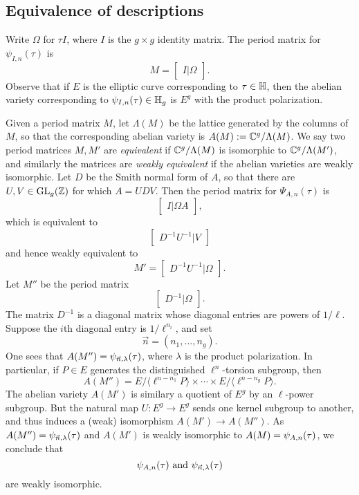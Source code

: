 \documentclass{amsart}
\begin{document}
\subsection{Equivalence of descriptions}

Write $\Omega$ for $\tau I$, where $I$ is the $g \times g$ identity matrix. The period matrix for $\psi_{I,n}(\tau)$ is
\[
  M = \begin{bmatrix}
    I | \Omega
  \end{bmatrix}.
\]
Observe that if $E$ is the elliptic curve corresponding to $\tau \in \mathbb{H}$, then the abelian variety corresponding to $\psi_{I,n}(\tau) \in \mathbb{H}_g$ is $E^g$ with the product polarization.

Given a period matrix $M$, let $\Lambda(M)$ be the lattice generated by the columns of $M$, so that the corresponding abelian variety is $A(M) := \mathbb{C}^g/\Lambda(M)$. We say two period matrices $M, M'$ are \emph{equivalent} if $\mathbb{C}^g/\Lambda(M)$ is isomorphic to $\mathbb{C}^g/\Lambda(M')$, and similarly the matrices are \emph{weakly equivalent} if the abelian varieties are weakly isomorphic. Let $D$ be the Smith normal form of $A$, so that there are $U,V \in \operatorname{GL}_g(\mathbb{Z})$ for which $A = UDV$. Then the period matrix for $\Psi_{A,n}(\tau)$ is
\[
  \begin{bmatrix}
    I | \Omega A
  \end{bmatrix},
\]
which is equivalent to
\[
  \begin{bmatrix}
    D^{-1}U^{-1} | V
  \end{bmatrix}
\]
and hence weakly equivalent to
\[
M' = \begin{bmatrix}
    D^{-1}U^{-1} | \Omega
  \end{bmatrix}.
\]
Let $M''$ be the period matrix\[
  \begin{bmatrix}
    D^{-1} | \Omega
  \end{bmatrix}.
\]
The matrix $D^{-1}$ is a diagonal matrix whose diagonal entries are powers of $1/\ell$. Suppose the $i$th diagonal entry is $1/\ell^{n_i}$, and set
\[
  \vec{n} = (n_1, \ldots, n_g).
\]
One sees that $A(M'') = \psi_{\vec{n},\lambda}(\tau)$, where $\lambda$ is the product polarization. In particular, if $P \in E$ generates the distinguished $\ell^n$-torsion subgroup, then
\[
  A(M'') = E/\langle \ell^{n-n_1} P \rangle \times \cdots \times E/\langle \ell^{n-n_g} P \rangle.
\]
The abelian variety $A(M')$ is similary a quotient of $E^g$ by an $\ell$-power subgroup. But the natural map $U: E^g \to E^g$ sends one kernel subgroup to another, and thus induces a (weak) isomorphism $A(M') \to A(M'')$. As $A(M'') = \psi_{\vec{n},\lambda}(\tau)$ and $A(M')$ is weakly isomorphic to $A(M) = \psi_{A,n}(\tau)$, we conclude that
\[
\psi_{A,n}(\tau) \textrm{ and } \psi_{\vec{n},\lambda}(\tau)
\]
are weakly isomorphic.
\end{document}
